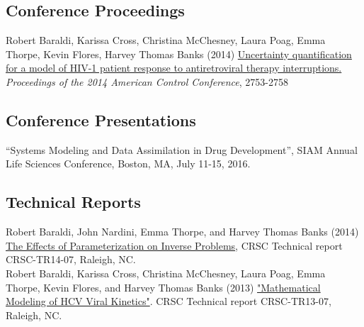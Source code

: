 \documentclass[10pt, a4paper]{article}
\newcommand{\years}[1]{\marginnote{\scriptsize #1}}
\begin{document}
\subsection*{Conference Proceedings}
\noindent
\years{2014} Robert Baraldi, Karissa Cross, Christina McChesney, Laura Poag, Emma Thorpe, Kevin Flores, Harvey Thomas Banks (2014) \href{http://ieeexplore.ieee.org/stamp/stamp.jsp?tp=&arnumber=6858714&isnumber=6858556}{Uncertainty quantification for a model of HIV-1 patient response to antiretroviral therapy interruptions.} \emph{Proceedings of the 2014 American Control Conference}, 2753-2758\\

\subsection*{Conference Presentations}
\noindent
\noindent
\years{2016} “Systems Modeling and Data Assimilation in Drug Development”, SIAM Annual Life Sciences Conference, Boston, MA, July 11-15, 2016.\\

\subsection*{Technical Reports}
\noindent
\years{2014} Robert Baraldi, John Nardini, Emma Thorpe, and Harvey Thomas Banks (2014) \href{ http://www.ncsu.edu/crsc/reports/ftp/pdf/crsc-tr14-07.pdf}{The Effects of Parameterization on Inverse Problems}, CRSC Technical report CRSC-TR14-07, Raleigh, NC.\\
\noindent
\years{2013} Robert Baraldi, Karissa Cross, Christina McChesney, Laura Poag, Emma Thorpe, Kevin Flores, and Harvey Thomas Banks (2013) \href{http://www.ncsu.edu/crsc/reports/ftp/pdf/crsc-tr13-07.pdf}{"Mathematical Modeling of HCV Viral Kinetics"}. CRSC Technical report CRSC-TR13-07, Raleigh, NC.\\
\end{document}
